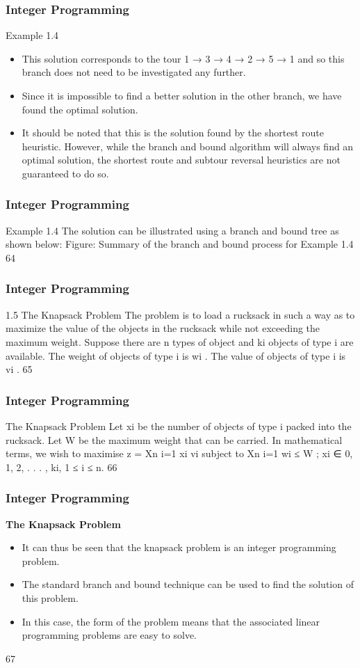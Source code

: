 \begin{frame} 
\frametitle{Integer Programming}     
Example 1.4
\begin{itemize}
\item This solution corresponds to the tour 1 → 3 → 4 → 2 → 5 → 1
and so this branch does not need to be investigated any further.
\item Since it is impossible to find a better solution in the other branch,
we have found the optimal solution.
\item It should be noted that this is the solution found by the shortest
route heuristic. However, while the branch and bound algorithm
will always find an optimal solution, the shortest route and subtour
reversal heuristics are not guaranteed to do so.
\end{itemize}
\end{frame}  
\begin{frame} 
\frametitle{Integer Programming}     
Example 1.4
The solution can be illustrated using a branch and bound tree as
shown below:
Figure: Summary of the branch and bound process for Example 1.4
64 \end{frame}  \begin{frame} \frametitle{Integer Programming}     
1.5 The Knapsack Problem
The problem is to load a rucksack in such a way as to maximize
the value of the objects in the rucksack while not exceeding the
maximum weight.
Suppose there are n types of object and ki objects of type i are
available.
The weight of objects of type i is wi
.
The value of objects of type i is vi
.
65 \end{frame}  \begin{frame} \frametitle{Integer Programming}     
The Knapsack Problem
Let xi be the number of objects of type i packed into the rucksack.
Let W be the maximum weight that can be carried.
In mathematical terms, we wish to maximise
z =
Xn
i=1
xi vi
subject to
Xn
i=1
wi ≤ W ; xi ∈ {0, 1, 2, . . . , ki}, 1 ≤ i ≤ n.
66 \end{frame}  
\begin{frame} 
\frametitle{Integer Programming}     
\noindent \textbf{The Knapsack Problem}\\
\begin{itemize}
	\item It can thus be seen that the knapsack problem is an integer
	programming problem.
	\item The standard branch and bound technique can be used to find the
	solution of this problem.
	\item In this case, the form of the problem means that the associated
	linear programming problems are easy to solve. 
\end{itemize}

67 
\end{frame}  
